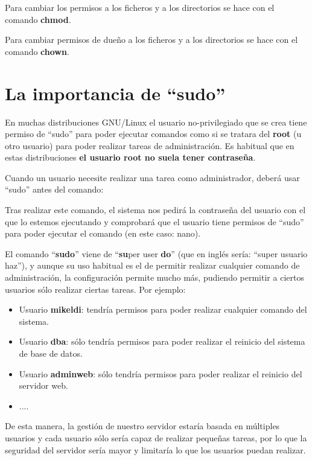 Para cambiar los permisos a los ficheros y a los directorios se hace con el comando \textbf{chmod}.

Para cambiar permisos de dueño a los ficheros y a los directorios se hace con el comando \textbf{chown}.

\section{La importancia de “sudo”}
En muchas distribuciones GNU/Linux el usuario no-privilegiado que se crea tiene permiso de “sudo” para poder ejecutar comandos como si se tratara del \textbf{root} (u otro usuario) para poder realizar tareas de administración. Es habitual que en estas distribuciones \textbf{el usuario root no suela tener contraseña}.

Cuando un usuario necesite realizar una tarea como administrador, deberá usar “sudo” antes del comando:


Tras realizar este comando, el sistema nos pedirá la contraseña del usuario con el que lo estemos ejecutando y comprobará que el usuario tiene permisos de “sudo” para poder ejecutar el comando (en este caso: nano).

El comando “\textbf{sudo}” viene de “\textbf{su}per user \textbf{do}” (que en inglés sería: “super usuario haz”), y aunque su uso habitual es el de permitir realizar cualquier comando de administración, la configuración permite mucho más, pudiendo permitir a ciertos usuarios sólo realizar ciertas tareas. Por ejemplo:

\begin{itemize}
    \item Usuario \textbf{mikeldi}: tendría permisos para poder realizar cualquier comando del sistema.
    \item Usuario \textbf{dba}: sólo tendría permisos para poder realizar el reinicio del sistema de base de datos.
    \item Usuario \textbf{adminweb}: sólo tendría permisos para poder realizar el reinicio del servidor web.
    \item ....
\end{itemize}

De esta manera, la gestión de nuestro servidor estaría basada en múltiples usuarios y cada usuario sólo sería capaz de realizar pequeñas tareas, por lo que la seguridad del servidor sería mayor y limitaría lo que los usuarios puedan realizar.

